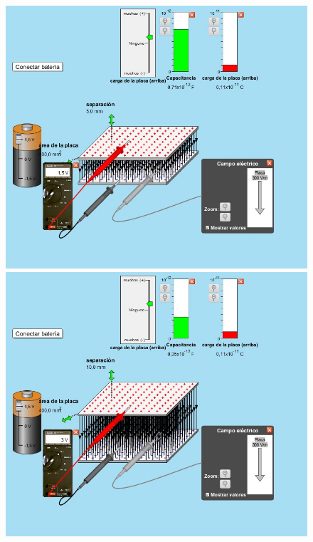 \documentclass[12pt]{report}
\begin{document}
\begin{enumerate}
\begin{enumerate}
      \begin{figure}[h]
          \centering
          \begin{minipage}[h]{0.45\textwidth}
          \centering
          \includegraphics[width=1\textwidth]{./images/3foto4.jpg} 
          \end{minipage}\hfill
          \begin{minipage}[h]{0.45\textwidth}
          \centering
          \includegraphics[width=1\textwidth]{./images/3foto5.jpg} 
       \end{minipage}
      \end{figure}


\end{enumerate}
\end{enumerate}
\end{document}
